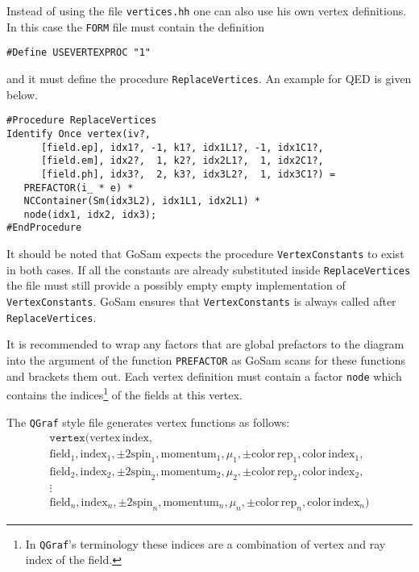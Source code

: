 \documentclass[11pt,a4paper]{refrep}
\newcommand{\gosamversion}{{3{.}0}}
\newcommand{\gosamv}[1][\gosamversion]{{\sc GoSam}\xspace}
\newcommand{\qgraf}{{\tt QGraf}\xspace}
\newcommand{\form}{{\tt FORM}\xspace}
\begin{document}
Instead of using the file \texttt{vertices.hh} one can also use
his own vertex definitions. In this case the \form{} file must contain
the definition
\begin{lstlisting}[language=form]
#Define USEVERTEXPROC "1"
\end{lstlisting}
and it must define the procedure \texttt{ReplaceVertices}. An example
for QED is given below.
\begin{maxipage}
\begin{lstlisting}[language=form]
#Procedure ReplaceVertices
Identify Once vertex(iv?,
      [field.ep], idx1?, -1, k1?, idx1L1?, -1, idx1C1?,
      [field.em], idx2?,  1, k2?, idx2L1?,  1, idx2C1?,
      [field.ph], idx3?,  2, k3?, idx3L2?,  1, idx3C1?) =
   PREFACTOR(i_ * e) *
   NCContainer(Sm(idx3L2), idx1L1, idx2L1) *
   node(idx1, idx2, idx3);
#EndProcedure
\end{lstlisting}
\end{maxipage}
It should be noted that \gosamv{} expects the procedure \texttt{VertexConstants}
to exist in both cases. If all the constants are already substituted inside
\texttt{ReplaceVertices} the file must still provide a possibly empty empty
implementation of \texttt{VertexConstants}. \gosamv{} ensures that
\texttt{VertexConstants} is always called after \texttt{ReplaceVertices}.

It is recommended to wrap any factors that are global prefactors to the diagram
into the argument of the function \texttt{PREFACTOR} as \gosamv{} scans for these
functions and brackets them out. Each vertex definition must contain a factor
\texttt{node} which contains the indices\footnote{In \qgraf's terminology
these indices are a combination of vertex and ray index of the field.}
of the fields at this vertex.

The \qgraf{} style file generates vertex functions as follows:
\begin{multline*}
\mathtt{vertex}(\mathrm{vertex\,index},\\
   \mathrm{field}_1, \mathrm{index}_1, \pm2\mathrm{spin}_1, \mathrm{momentum}_1, \mu_1, \pm\mathrm{color\,rep}_1, %
   \mathrm{color\,index}_1,\\
   \mathrm{field}_2, \mathrm{index}_2, \pm2\mathrm{spin}_2, \mathrm{momentum}_2, \mu_2, \pm\mathrm{color\,rep}_2, %
   \mathrm{color\,index}_2,\\
   \vdots\\
   \mathrm{field}_n, \mathrm{index}_n, \pm2\mathrm{spin}_n, \mathrm{momentum}_n, \mu_n, \pm\mathrm{color\,rep}_n, %
   \mathrm{color\,index}_n)
\end{multline*}
\end{document}
